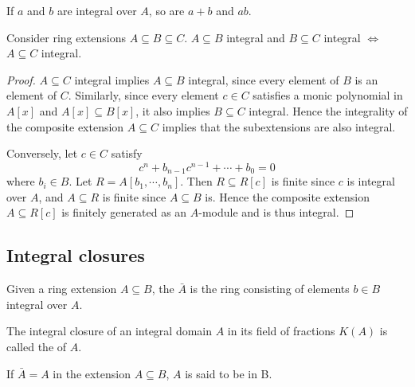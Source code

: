 \begin{corollary}{\label{integrality-of-sums-products}}
  If $a$ and $b$ are integral over $A$, so are $a + b$ and $ab$.
\end{corollary}

\begin{theorem}{\label{integrality-trans}}
  Consider ring extensions $A \subseteq B \subseteq C$. $A \subseteq B$ integral
  and $B \subseteq C$ integral $\iff$ $A \subseteq C$ integral.
\end{theorem}
\begin{proof}
  $A \subseteq C$ integral implies $A \subseteq B$ integral, since every
  element of $B$ is an element of $C$. Similarly, since every element $c\in C$
  satisfies a monic polynomial in $A[x]$ and $A[x] \subseteq B[x]$, it also
  implies $B \subseteq C$ integral. Hence the integrality of the composite
  extension $A\subseteq C$ implies that the subextensions are also integral.

  \medskip\noindent Conversely, let $c\in C$ satisfy \[ c^n + b_{n-1}c^{n-1} +
  \cdots + b_0 = 0 \] where $b_i\in B$. Let $R = A[b_1,\cdots,b_n]$. Then
  $R \subseteq {R[c]}$ is finite since $c$ is integral over $A$, and
  $A \subseteq R$ is finite since $A \subseteq B$ is. Hence the
  composite extension $A \subseteq R[c]$ is finitely generated as an
  $A$-module and is thus integral.
\end{proof}

\subsection{Integral closures}

\begin{definition}
  Given a ring extension $A \subseteq B$, the  $\bar A$
  is the ring consisting of elements $b\in B$ integral over $A$.
\end{definition}

\begin{definition}
  The integral closure of an integral domain $A$ in its field of fractions
  $K(A)$ is called the  of $A$.
\end{definition}

\begin{definition}
  If $\bar A = A$ in the extension $A \subseteq B$, $A$ is said to be
   in B.
\end{definition}


